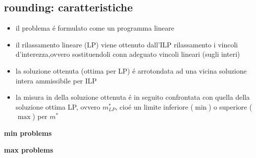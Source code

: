 \subsection*{rounding: caratteristiche}
\begin{flushleft}
	\begin{itemize}
		\item il problema \'e formulato come un programma lineare
		\item il rilassamento lineare (LP) viene ottenuto dall'ILP rilassamento i vincoli d'interezza,ovvero sostituendoli conn adeguato vincoli lineari (sugli interi)
		\item la soluzione ottenuta (ottima per LP) \'e arrotondata ad una vicina soluzione intera ammissibile per ILP
		\item la misura in della soluzione ottenuta \'e in seguito confrontata con quella della soluzione ottima LP, ovvero $m_{LP}^*$, cio\'e un limite inferiore ($\min$) o superiore ($\max$) per $m^*$
	\end{itemize}
	\vspace{0.5cm}
	\begin{center}
		\textbf{min problems}\newline \\
		\vspace{0.3cm}
	\end{center}
	\begin{center}
		\textbf{max problems}\newline \\
		\vspace{0.3cm}
	\end{center}
\end{flushleft}

